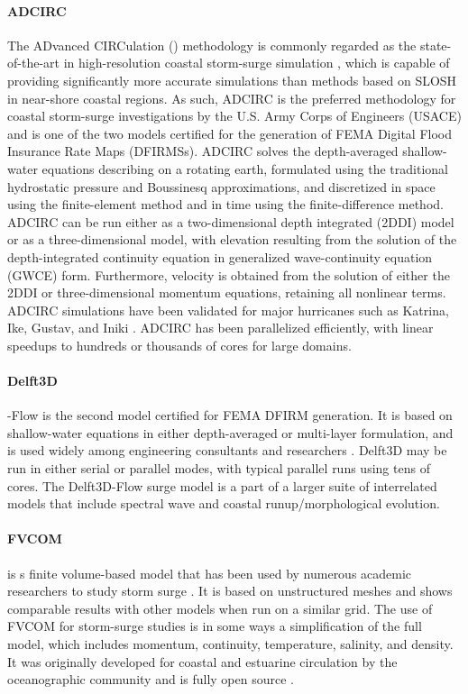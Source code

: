 \paragraph{ADCIRC} The ADvanced CIRCulation () methodology is commonly regarded as the state-of-the-art in high-resolution coastal storm-surge simulation \citep{luettich1992adcirc}, which is capable of providing significantly more accurate simulations than methods based on SLOSH \citep{resio2008modeling} in near-shore coastal regions. As such, ADCIRC is the preferred methodology for coastal storm-surge investigations by the U.S. Army Corps of Engineers (USACE) and is one of the two models certified for the generation of FEMA Digital Flood Insurance Rate Maps (DFIRMSs). ADCIRC solves the depth-averaged shallow-water equations describing on a rotating earth, formulated using the traditional hydrostatic pressure and Boussinesq approximations, and discretized in space using the finite-element method and in time using the finite-difference method. ADCIRC can be run either as a two-dimensional depth integrated (2DDI) model or as a three-dimensional model, with elevation resulting from the solution of the depth-integrated continuity equation in generalized wave-continuity equation (GWCE) form. Furthermore, velocity is obtained from the solution of either the 2DDI or three-dimensional momentum equations, retaining all nonlinear terms. ADCIRC simulations have been validated for major hurricanes such as Katrina, Ike, Gustav, and Iniki \citep{kennedy2011origin,kennedy2012tropical}. ADCIRC has been parallelized efficiently, with linear speedups to hundreds or thousands of cores for large domains. 

\paragraph{Delft3D} -Flow is the second model certified for FEMA DFIRM generation. It is based on shallow-water equations in either depth-averaged or multi-layer formulation, and is used widely among engineering consultants and researchers \citep{hu2015numerical,vousdoukas2016projections}. Delft3D may be run in either serial or parallel modes, with typical parallel runs using tens of cores. The Delft3D-Flow surge model is a part of a larger suite of interrelated models that include spectral wave and coastal runup/morphological evolution. 

\paragraph{FVCOM}  is s finite volume-based model that has been used by numerous academic researchers to study storm surge \citep{kerr2013ioos,rego2010storm}. It is based on unstructured meshes and shows comparable results with other models when run on a similar grid. The use of FVCOM for storm-surge studies is in some ways a simplification of the full model, which includes momentum, continuity, temperature, salinity, and density. It was originally developed for coastal and estuarine circulation by the oceanographic community and is fully open source \citep{chen2003unstructured}. 

